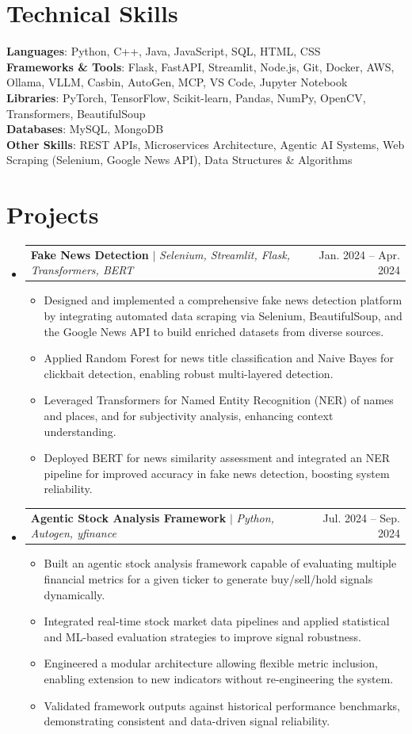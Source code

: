 \documentclass[letterpaper,11pt]{article}
\makeatletter
\newcommand{\resumeItem}[1]{
  \item\small{
    {#1 \vspace{-2pt}}
  }
}
\newcommand{\resumeProjectHeading}[2]{
    \item
    \begin{tabular*}{0.97\textwidth}{l@{\extracolsep{\fill}}r}
      \small#1 & #2 \\
    \end{tabular*}\vspace{-7pt}
}
\newcommand{\resumeSubHeadingListStart}{\begin{itemize}[leftmargin=0.15in, label={}]}
\newcommand{\resumeSubHeadingListEnd}{\end{itemize}}
\newcommand{\resumeItemListStart}{\begin{itemize}}
\newcommand{\resumeItemListEnd}{\end{itemize}\vspace{-5pt}}
\makeatother
\begin{document}
\section{\textcolor{blue(pigment)}{Technical Skills}}
 \begin{itemize}[leftmargin=0.15in, label={}]
    \small{\item{
     \textbf{Languages}{: Python, C++, Java, JavaScript, SQL, HTML, CSS} \\
     \textbf{Frameworks \& Tools}{: Flask, FastAPI, Streamlit, Node.js, Git, Docker, AWS, Ollama, VLLM, Casbin, AutoGen, MCP, VS Code, Jupyter Notebook} \\
     \textbf{Libraries}{: PyTorch, TensorFlow, Scikit-learn, Pandas, NumPy, OpenCV, Transformers, BeautifulSoup} \\
     \textbf{Databases}{: MySQL, MongoDB} \\
     \textbf{Other Skills}{: REST APIs, Microservices Architecture, Agentic AI Systems, Web Scraping (Selenium, Google News API), Data Structures \& Algorithms}
    }}
 \end{itemize}


\section{\textcolor{blue(pigment)}{Projects}}
  \resumeSubHeadingListStart
    \resumeProjectHeading
      {\textbf{Fake News Detection} $|$ \emph{Selenium, Streamlit, Flask, Transformers, BERT}}{Jan. 2024 -- Apr. 2024}
      \resumeItemListStart
        \resumeItem{Designed and implemented a comprehensive fake news detection platform by integrating automated data scraping via Selenium, BeautifulSoup, and the Google News API to build enriched datasets from diverse sources.}
        \resumeItem{Applied Random Forest for news title classification and Naive Bayes for clickbait detection, enabling robust multi-layered detection.}
        \resumeItem{Leveraged Transformers for Named Entity Recognition (NER) of names and places, and for subjectivity analysis, enhancing context understanding.}
        \resumeItem{Deployed BERT for news similarity assessment and integrated an NER pipeline for improved accuracy in fake news detection, boosting system reliability.}
      \resumeItemListEnd

    \resumeProjectHeading
      {\textbf{Agentic Stock Analysis Framework} $|$ \emph{Python, Autogen, yfinance}}{Jul. 2024 -- Sep. 2024}
      \resumeItemListStart
        \resumeItem{Built an agentic stock analysis framework capable of evaluating multiple financial metrics for a given ticker to generate buy/sell/hold signals dynamically.}
        \resumeItem{Integrated real-time stock market data pipelines and applied statistical and ML-based evaluation strategies to improve signal robustness.}
        \resumeItem{Engineered a modular architecture allowing flexible metric inclusion, enabling extension to new indicators without re-engineering the system.}
        \resumeItem{Validated framework outputs against historical performance benchmarks, demonstrating consistent and data-driven signal reliability.}
      \resumeItemListEnd
  \resumeSubHeadingListEnd
\end{document}

